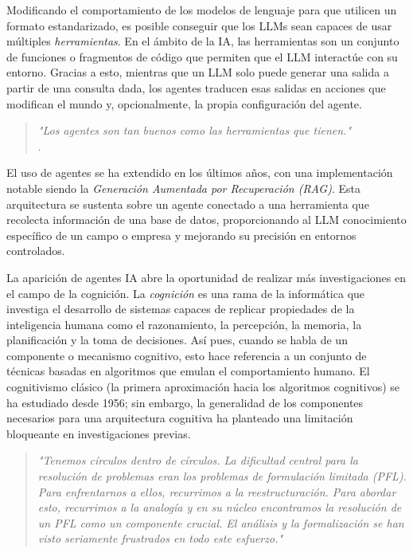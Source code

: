 Modificando el comportamiento de los modelos de lenguaje para que utilicen un 
formato estandarizado, es posible conseguir que los LLMs sean capaces de usar múltiples \emph{herramientas}.
En el ámbito de la IA, las herramientas son un conjunto de funciones o
fragmentos de código que permiten que el LLM interactúe con su entorno. Gracias
a esto, mientras que un LLM solo puede generar una salida a partir de una
consulta dada, los agentes traducen esas salidas en acciones que modifican el
mundo y, opcionalmente, la propia configuración del agente.

\begin{quote} \small\textit{
    "Los agentes son tan buenos como las herramientas que tienen."
} \\ 
\citep{langchain-docs-2024}.  \end{quote}

El uso de agentes se ha extendido en los últimos años, con una implementación
notable siendo la \emph{Generación Aumentada por Recuperación (RAG)}. Esta
arquitectura se sustenta sobre un agente conectado a una herramienta que
recolecta información de una base de datos, proporcionando al LLM conocimiento
específico de un campo o empresa y mejorando su precisión en entornos controlados.

La aparición de agentes IA abre la oportunidad de realizar más
investigaciones en el campo de la cognición. La \emph{cognición} es una rama de la
informática que investiga el desarrollo de sistemas capaces de replicar
propiedades de la inteligencia humana como el razonamiento, la percepción, la
memoria, la planificación y la toma de decisiones. Así pues, cuando se habla 
de un componente o mecanismo cognitivo, esto hace referencia a un
conjunto de técnicas basadas en algoritmos que emulan el comportamiento
humano. El cognitivismo clásico (la primera aproximación hacia los algoritmos cognitivos) se ha estudiado desde
1956; sin embargo, la generalidad de los componentes necesarios para una arquitectura cognitiva ha
planteado una limitación bloqueante en investigaciones previas.

\begin{quote} \small\textit{ 
    "Tenemos círculos dentro de círculos. La dificultad central para la
    resolución de problemas eran los problemas de formulación limitada (PFL).
    Para enfrentarnos a ellos, recurrimos a la reestructuración.  Para abordar
    esto, recurrimos a la analogía y en su núcleo encontramos la resolución de
    un PFL como un componente crucial. El análisis y la formalización se han
    visto seriamente frustrados en todo este esfuerzo."
\citet{vervaeke1999naturalistic} } \end{quote}

